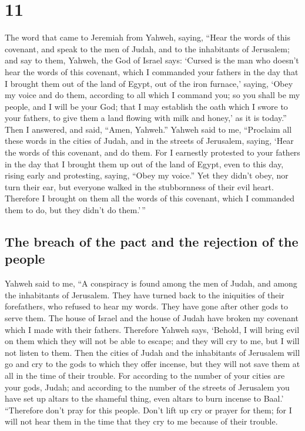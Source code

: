 \hypertarget{section-10}{%
\section{11}\label{section-10}}

 The word that came to Jeremiah from Yahweh, saying,
 ``Hear the words of this covenant, and speak to the men
of Judah, and to the inhabitants of Jerusalem;  and say to
them, Yahweh, the God of Israel says: `Cursed is the man who doesn't
hear the words of this covenant,  which I commanded your
fathers in the day that I brought them out of the land of Egypt, out of
the iron furnace,' saying, `Obey my voice and do them, according to all
which I command you; so you shall be my people, and I will be your God;
 that I may establish the oath which I swore to your
fathers, to give them a land flowing with milk and honey,' as it is
today.'' Then I answered, and said, ``Amen, Yahweh.'' 
Yahweh said to me, ``Proclaim all these words in the cities of Judah,
and in the streets of Jerusalem, saying, `Hear the words of this
covenant, and do them.  For I earnestly protested to your
fathers in the day that I brought them up out of the land of Egypt, even
to this day, rising early and protesting, saying, ``Obey my voice.''
 Yet they didn't obey, nor turn their ear, but everyone
walked in the stubbornness of their evil heart. Therefore I brought on
them all the words of this covenant, which I commanded them to do, but
they didn't do them.'\,''

\hypertarget{the-breach-of-the-pact-and-the-rejection-of-the-people}{%
\subsection{The breach of the pact and the rejection of the
people}\label{the-breach-of-the-pact-and-the-rejection-of-the-people}}

 Yahweh said to me, ``A conspiracy is found among the men
of Judah, and among the inhabitants of Jerusalem.  They
have turned back to the iniquities of their forefathers, who refused to
hear my words. They have gone after other gods to serve them. The house
of Israel and the house of Judah have broken my covenant which I made
with their fathers.  Therefore Yahweh says, `Behold, I
will bring evil on them which they will not be able to escape; and they
will cry to me, but I will not listen to them.  Then the
cities of Judah and the inhabitants of Jerusalem will go and cry to the
gods to which they offer incense, but they will not save them at all in
the time of their trouble.  For according to the number
of your cities are your gods, Judah; and according to the number of the
streets of Jerusalem you have set up altars to the shameful thing, even
altars to burn incense to Baal.'  ``Therefore don't pray
for this people. Don't lift up cry or prayer for them; for I will not
hear them in the time that they cry to me because of their trouble.

